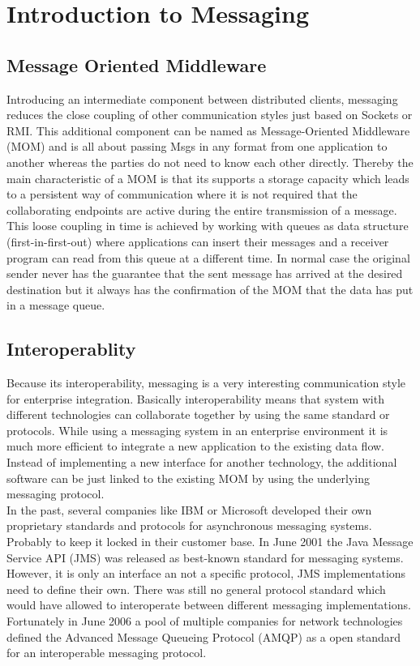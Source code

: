 \chapter{Introduction to Messaging} 

\section{Message Oriented Middleware}
\label{intro-messaging-mom}
Introducing an intermediate component between distributed
clients, messaging reduces the close coupling of other communication styles just
based on \gls{Socket}s or RMI. This additional component can be named as
Message-Oriented Middleware (MOM) and is all about passing \gls{Msg}s in any
format from one application to another whereas the parties do not need to know
each other directly. Thereby the main characteristic of a MOM is that its
supports a storage capacity which leads to a persistent way of communication where it is
not required that the collaborating endpoints are active during the entire
transmission of a message. This loose coupling in time is achieved by
working with queues as data structure (first-in-first-out) where applications
can insert their messages and a receiver program can read from this queue at a
different time. In normal case the original sender
never has the guarantee that the sent message has arrived at the desired
destination but it always has the confirmation of the MOM that the data has put
in a message queue. \cite{PprIBMIntro} \cite{TAN06}

\section{Interoperablity}
Because its interoperability, messaging is a very interesting communication
style for enterprise integration. Basically interoperability means that system with
different technologies can collaborate together by using the same standard or
protocols. While using a messaging system in an enterprise environment it is
much more efficient to integrate a new application to the existing data flow.
Instead of implementing a new interface for another technology, the additional
software can be just linked to the existing MOM by using the underlying
messaging protocol.\\

In the past, several companies like IBM or Microsoft developed their own
proprietary standards and protocols for asynchronous messaging systems.
Probably to keep it locked in their customer base. In June 2001 the Java Message
Service API (JMS) was released as best-known standard for messaging systems.
However, it is only an interface an not a specific protocol, JMS implementations
need to define their own. There was still no general protocol standard which
would have allowed to interoperate between different messaging implementations.
Fortunately in June 2006 a pool of multiple companies for network technologies
defined the Advanced Message Queueing Protocol (AMQP) as a open standard for an
interoperable messaging protocol. \cite{PrpAMQP}
 
